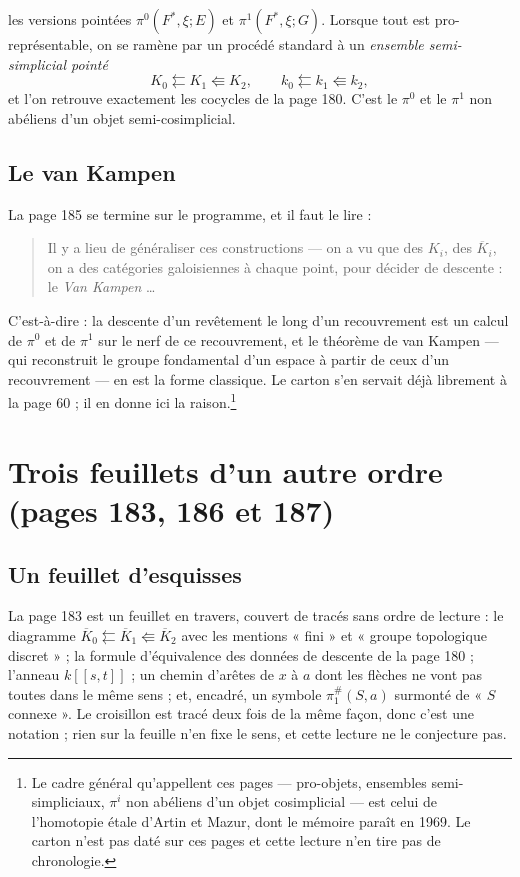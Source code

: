 \documentclass[11pt,a4paper]{article}
\begin{document}
les versions pointées $\pi^{0}(F^{*}, \xi; E)$ et $\pi^{1}(F^{*}, \xi; G)$.
Lorsque tout est pro-représentable, on se ramène par un procédé standard à un
\emph{ensemble semi-simplicial pointé}
\[
  K_{0} \leftleftarrows K_{1} \Lleftarrow K_{2} ,
  \qquad
  k_{0} \leftleftarrows k_{1} \Lleftarrow k_{2} ,
\]
et l'on retrouve exactement les cocycles de la page 180. C'est le $\pi^{0}$ et
le $\pi^{1}$ non abéliens d'un objet semi-cosimplicial.

\subsection*{Le van Kampen}

La page 185 se termine sur le programme, et il faut le lire :

\begin{quote}
Il y a lieu de généraliser ces constructions --- on a vu que des $K_{i}$, des
$\overline{K}_{i}$, on a des catégories galoisiennes à chaque point, pour
décider de descente : le \emph{Van Kampen} \dots
\end{quote}

C'est-à-dire : la descente d'un revêtement le long d'un recouvrement est un
calcul de $\pi^{0}$ et de $\pi^{1}$ sur le nerf de ce recouvrement, et le
théorème de van Kampen --- qui reconstruit le groupe fondamental d'un espace à
partir de ceux d'un recouvrement --- en est la forme classique. Le carton s'en
servait déjà librement à la page 60 ; il en donne ici la raison.\footnote{Le
cadre général qu'appellent ces pages --- pro-objets, ensembles semi-simpliciaux,
$\pi^{i}$ non abéliens d'un objet cosimplicial --- est celui de l'homotopie
étale d'Artin et Mazur, dont le mémoire paraît en 1969. Le carton n'est pas
daté sur ces pages et cette lecture n'en tire pas de chronologie.}

\section*{Trois feuillets d'un autre ordre (pages 183, 186 et 187)}

\subsection*{Un feuillet d'esquisses}

La page 183 est un feuillet en travers, couvert de tracés sans ordre de
lecture : le diagramme $\overline{K}_{0} \leftleftarrows \overline{K}_{1}
\Lleftarrow \overline{K}_{2}$ avec les mentions « fini » et « groupe
topologique discret » ; la formule d'équivalence des données de descente de la
page 180 ; l'anneau $k[[s,t]]$ ; un chemin d'arêtes de $x$ à $a$ dont les
flèches ne vont pas toutes dans le même sens ; et, encadré, un symbole
$\pi_{1}^{\#}(S,a)$ surmonté de « $S$ connexe ». Le croisillon est tracé deux
fois de la même façon, donc c'est une notation ; rien sur la feuille n'en fixe
le sens, et cette lecture ne le conjecture pas.
\end{document}
